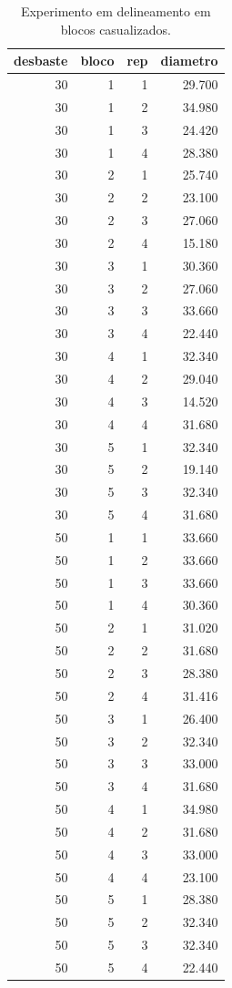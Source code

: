 \documentclass[
]{article}
\begin{document}
\begin{table}

\caption{\label{tab:unnamed-chunk-179}Experimento em delineamento em blocos casualizados.}
\centering
\begin{tabular}[t]{r|r|r|r}
\hline
desbaste & bloco & rep & diametro\\
\hline
30 & 1 & 1 & 29.700\\
\hline
30 & 1 & 2 & 34.980\\
\hline
30 & 1 & 3 & 24.420\\
\hline
30 & 1 & 4 & 28.380\\
\hline
30 & 2 & 1 & 25.740\\
\hline
30 & 2 & 2 & 23.100\\
\hline
30 & 2 & 3 & 27.060\\
\hline
30 & 2 & 4 & 15.180\\
\hline
30 & 3 & 1 & 30.360\\
\hline
30 & 3 & 2 & 27.060\\
\hline
30 & 3 & 3 & 33.660\\
\hline
30 & 3 & 4 & 22.440\\
\hline
30 & 4 & 1 & 32.340\\
\hline
30 & 4 & 2 & 29.040\\
\hline
30 & 4 & 3 & 14.520\\
\hline
30 & 4 & 4 & 31.680\\
\hline
30 & 5 & 1 & 32.340\\
\hline
30 & 5 & 2 & 19.140\\
\hline
30 & 5 & 3 & 32.340\\
\hline
30 & 5 & 4 & 31.680\\
\hline
50 & 1 & 1 & 33.660\\
\hline
50 & 1 & 2 & 33.660\\
\hline
50 & 1 & 3 & 33.660\\
\hline
50 & 1 & 4 & 30.360\\
\hline
50 & 2 & 1 & 31.020\\
\hline
50 & 2 & 2 & 31.680\\
\hline
50 & 2 & 3 & 28.380\\
\hline
50 & 2 & 4 & 31.416\\
\hline
50 & 3 & 1 & 26.400\\
\hline
50 & 3 & 2 & 32.340\\
\hline
50 & 3 & 3 & 33.000\\
\hline
50 & 3 & 4 & 31.680\\
\hline
50 & 4 & 1 & 34.980\\
\hline
50 & 4 & 2 & 31.680\\
\hline
50 & 4 & 3 & 33.000\\
\hline
50 & 4 & 4 & 23.100\\
\hline
50 & 5 & 1 & 28.380\\
\hline
50 & 5 & 2 & 32.340\\
\hline
50 & 5 & 3 & 32.340\\
\hline
50 & 5 & 4 & 22.440\\
\hline
\end{tabular}
\end{table}
\end{document}
